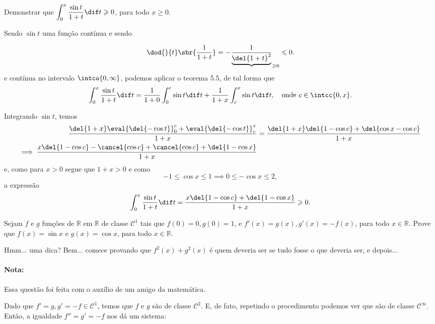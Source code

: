 \documentclass{IMTexam}
\begin{document}
\begin{questions}

		\question Demonstrar que $ \displaystyle\int_{0}^{x}\dfrac{\sin t}{1+t}\dif t\geqslant0 $, para todo $ x\geqslant0 $.
		
		\begin{solution}
			Sendo $ \sin t $ uma função contínua e sendo
			
			
			\[ \dod{}{t}\sbr{\dfrac{1}{1+t}}=-\dfrac{1}{\underbrace{\del{1+t}^{2}}}_{\geqslant0}\leqslant 0. \]
			e contínua no intervalo $ \intco{0,\infty} $, podemos aplicar o teorema 5.5, de tal forma que
			\[ \int_{0}^{x}\dfrac{\sin t}{1+t}\dif t=\dfrac{1}{1+0}\int_{0}^{c}\sin t\dif t +\dfrac{1}{1+x}\int_{c}^{x}\sin t\dif t,\quad\text{onde }c\in\intcc{0,x}. \]
			
			Integrando $ \sin t $, temos
			\begin{align*}
				\dfrac{\del{1+x}\eval{\del{-\cos t}}_{0}^{c}+\eval{\del{-\cos t}}_{c}^{x}}{1+x}&=\dfrac{\del{1+x}\del{1-\cos c}+\del{\cos x-\cos c}}{1+x}\\
				\implies \dfrac{x\del{1-\cos c}-\cancel{\cos c}+\cancel{\cos c}+\del{1-\cos x}}{1+x}
			\end{align*}
			e, como para $ x>0 $ segue que $ 1+x>0 $ e como
			\[ -1\leqslant \cos x\leqslant 1\implies 0\leqslant -\cos x\leqslant 2, \]
			a expressão
			\[ \int_{0}^{x}\dfrac{\sin t}{1+t}\dif t=\dfrac{x\del{1-\cos c}+\del{1-\cos x}}{1+x}\geqslant0. \]
			
			\hfill\qedsymbol
		\end{solution}
	
		\question Sejam $ f $ e $ g $ funções de $ \mathbb{R} $ em $ \mathbb{R} $ de classe $ \mathcal{C}^{1} $ tais que $ f(0)=0,g(0)=1 $, e $ f'(x)=g(x),g'(x)=-f(x) $, para todo $ x\in\mathbb{R} $. Prove que $ f(x)=\sin x $ e $ g(x)=\cos x $, para todo $ x\in\mathbb{R} $.
		
		Hmm... uma dica? Bem... comece provando que $ f^{2}(x)+g^{2}(x) $ é quem deveria ser se tudo fosse o que deveria ser, e depois...
		
		\begin{solution}
			\paragraph{Nota:} Essa questão foi feita com o auxílio de um amigo da matemática.
			
			Dado que $f'= g , g'=-f\in \mathcal C^1$, temos que $f$ e $g$ são de classe $\mathcal C^2$. E, de fato, repetindo o procedimento podemos ver que são de classe $\mathcal C^\infty$. Então, a igualdade $f'' = g' = -f$ nos dá um sistema:
			

\end{solution}
\end{questions}
\end{document}
